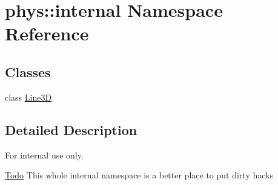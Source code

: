 \hypertarget{namespacephys_1_1internal}{
\section{phys::internal Namespace Reference}
\label{d0/d26/namespacephys_1_1internal}
}
\subsection*{Classes}
\begin{DoxyCompactItemize}
\item 
class \hyperlink{classphys_1_1internal_1_1Line3D}{Line3D}
\end{DoxyCompactItemize}


\subsection{Detailed Description}
\begin{DoxyInternal}{For internal use only.}
\begin{Desc}
\item[\hyperlink{todo__todo000008}{Todo}]This whole internal namespace is a better place to put dirty hacks \end{Desc}
\end{DoxyInternal}
